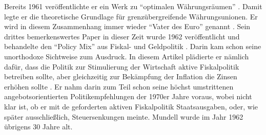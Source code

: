 Bereits 1961 veröffentlichte er ein Werk zu "`optimalen Währungsräumen"' \parencite{Mundell1961}. Damit legte er die theoretische Grundlage für grenzübergreifende Währungsunionen. Er wird in diesem Zusammenhang immer wieder "`Vater des Euro"' genannt \parencite{Mundell2006}.
Sein drittes bemerkenswertes Paper in dieser Zeit wurde 1962 veröffentlicht und behandelte den "`Policy Mix"' aus Fiskal- und Geldpolitik \parencite{Mundell1962}. Darin kam schon seine unorthodoxe Sichtweise zum Ausdruck. In diesem Artikel plädierte er nämlich dafür, dass die Politik zur Stimulierung der Wirtschaft aktive Fiskalpolitik betreiben sollte, aber gleichzeitig zur Bekämpfung der Inflation die Zinsen erhöhen sollte \parencite[S. 121]{Appelbaum2019}. Er nahm darin zum Teil schon seine höchst umstrittenen angebotsorientierten Politikempfehlungen der 1970er Jahre voraus, wobei nicht klar ist, ob er mit de geforderten aktiven Fiskalpolitik Staatsausgaben, oder, wie später ausschließlich, Steuersenkungen meinte. Mundell wurde im Jahr 1962 übrigens 30 Jahre alt. 

